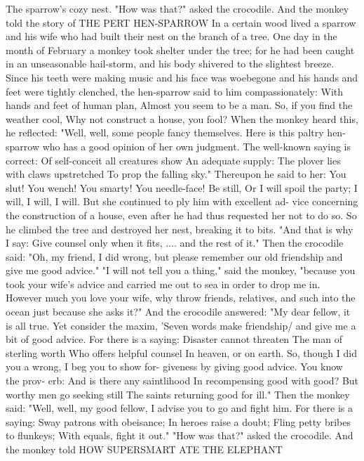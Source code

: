 \documentclass{book}
\begin{document}
The sparrow's cozy nest.
"How was that?" asked the crocodile. And the
monkey told the story of
THE PERT HEN-SPARROW
In a certain wood lived a sparrow and his wife
who had built their nest on the branch of a tree.
One day in the month of February a monkey took
shelter under the tree; for he had been caught in an
unseasonable hail-storm, and his body shivered to
the slightest breeze. Since his teeth were making
music and his face was woebegone and his hands and
feet were tightly clenched, the hen-sparrow said to
him compassionately:
With hands and feet of human plan,
Almost you seem to be a man.
So, if you find the weather cool,
Why not construct a house, you fool?
When the monkey heard this, he reflected: "Well,
well, some people fancy themselves. Here is this
paltry hen-sparrow who has a good opinion of her
own judgment. The well-known saying is correct:
Of self-conceit all creatures show
An adequate supply:
The plover lies with claws upstretched
To prop the falling sky."
Thereupon he said to her:
You slut! You wench! You smarty!
You needle-face! Be still,
Or I will spoil the party;
I will, I will, I will.
But she continued to ply him with excellent ad-
vice concerning the construction of a house, even
after he had thus requested her not to do so. So he
climbed the tree and destroyed her nest, breaking it
to bits.
"And that is why I say:
Give counsel only when it fits, ....
and the rest of it."
Then the crocodile said: "Oh, my friend, I did
wrong, but please remember our old friendship and
give me good advice."
"I will not tell you a thing," said the monkey,
"because you took your wife's advice and carried me
out to sea in order to drop me in. However much you
love your wife, why throw friends, relatives, and
such into the ocean just because she asks it?"
And the crocodile answered: "My dear fellow,
it is all true. Yet consider the maxim, 'Seven words
make friendship/ and give me a bit of good advice.
For there is a saying:
Disaster cannot threaten
The man of sterling worth
Who offers helpful counsel
In heaven, or on earth.
So, though I did you a wrong, I beg you to show for-
giveness by giving good advice. You know the prov-
erb:
And is there any saintlihood
In recompensing good with good?
But worthy men go seeking still
The saints returning good for ill."
Then the monkey said: "Well, well, my good
fellow, I advise you to go and fight him. For there
is a saying:
Sway patrons with obeisance;
In heroes raise a doubt;
Fling petty bribes to flunkeys;
With equals, fight it out."
"How was that?" asked the crocodile. And the
monkey told
HOW SUPERSMART ATE THE ELEPHANT
\end{document}
